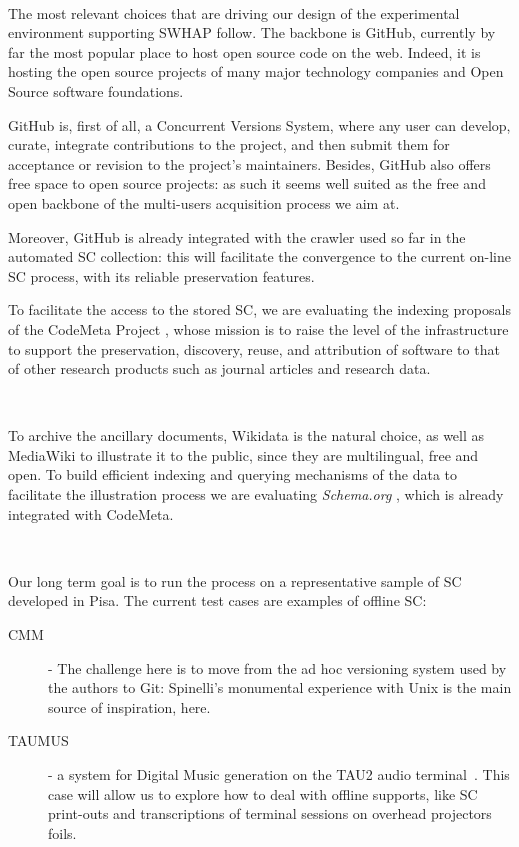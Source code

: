 \documentclass[a4paper]{article}
\begin{document}
\

\noindent
The most relevant choices that are driving our design of the experimental  environment supporting SWHAP follow. The backbone is GitHub, currently by far the most popular place to host open source code on the web. Indeed, it is hosting the open source projects of many major technology companies and Open Source software foundations.

GitHub is, first of all, a Concurrent Versions System, where any user can develop, curate, integrate contributions to the project, and then submit them  for acceptance or revision to the project's maintainers. Besides, GitHub also offers free space to open source projects: as such it seems well suited as the free and open backbone of the multi-users acquisition process we aim at.

Moreover, GitHub is already integrated with the crawler used so far in the automated SC collection: this will facilitate the convergence to the current on-line SC process, with its reliable preservation features. 

To facilitate the access to the stored SC, we are evaluating the indexing proposals of the CodeMeta Project \cite{CodeMeta}, whose mission is to raise the level of the infrastructure to support the preservation, discovery, reuse, and attribution of software to that of other research products such as journal articles and research data. 

\

\noindent
To archive the ancillary documents, Wikidata \cite{wiki:Wikidata} is the natural choice, as well as MediaWiki \cite{wiki:Mediawiki}to illustrate it to the public, since they are multilingual, free and open. To build efficient indexing and querying mechanisms of the data to facilitate the illustration process we are evaluating \emph{Schema.org} \cite{w3:SchemaOrg}, which is already integrated with CodeMeta.

\

\noindent
Our long term goal is to run the process on a representative sample of SC developed in Pisa. The current test cases are examples of offline SC:
\begin{description}
	\item[CMM] -  The challenge here is to move from the ad hoc versioning system used by the authors to Git: Spinelli's monumental experience with Unix \cite{Spi16g}is the main source of inspiration, here. 
	\item[TAUMUS] - a system for Digital Music generation on the TAU2 audio terminal~\cite{TAU2:1976}. This case will allow us to explore how to deal with offline supports, like SC print-outs and transcriptions of terminal sessions on overhead projectors foils.
\end{description}
\end{document}

